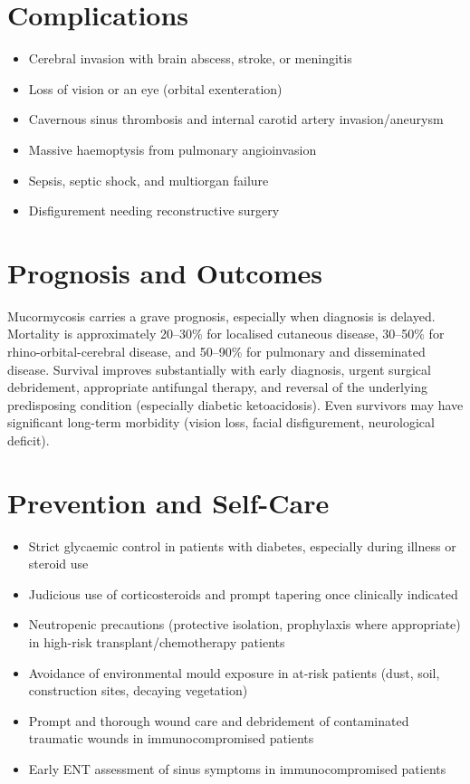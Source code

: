 \section*{Complications}
\begin{itemize}
    \item Cerebral invasion with brain abscess, stroke, or meningitis
    \item Loss of vision or an eye (orbital exenteration)
    \item Cavernous sinus thrombosis and internal carotid artery invasion/aneurysm
    \item Massive haemoptysis from pulmonary angioinvasion
    \item Sepsis, septic shock, and multiorgan failure
    \item Disfigurement needing reconstructive surgery
\end{itemize}

\section*{Prognosis and Outcomes}
Mucormycosis carries a grave prognosis, especially when diagnosis is delayed. Mortality is approximately 20--30\% for localised cutaneous disease, 30--50\% for rhino-orbital-cerebral disease, and 50--90\% for pulmonary and disseminated disease. Survival improves substantially with early diagnosis, urgent surgical debridement, appropriate antifungal therapy, and reversal of the underlying predisposing condition (especially diabetic ketoacidosis). Even survivors may have significant long-term morbidity (vision loss, facial disfigurement, neurological deficit).

\section*{Prevention and Self-Care}
\begin{itemize}
    \item Strict glycaemic control in patients with diabetes, especially during illness or steroid use
    \item Judicious use of corticosteroids and prompt tapering once clinically indicated
    \item Neutropenic precautions (protective isolation, prophylaxis where appropriate) in high-risk transplant/chemotherapy patients
    \item Avoidance of environmental mould exposure in at-risk patients (dust, soil, construction sites, decaying vegetation)
    \item Prompt and thorough wound care and debridement of contaminated traumatic wounds in immunocompromised patients
    \item Early ENT assessment of sinus symptoms in immunocompromised patients
\end{itemize}

